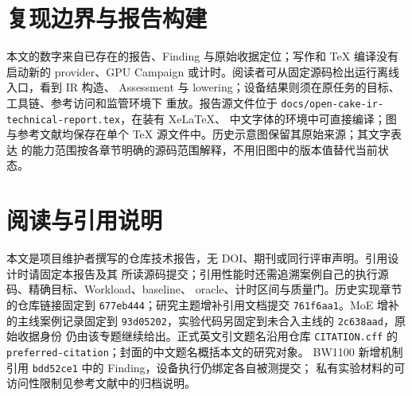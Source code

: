 \documentclass[UTF8,11pt,a4paper,fontset=none]{ctexart}
\newcommand{\code}[1]{\texttt{#1}}
\begin{document}
\section{复现边界与报告构建}

本文的数字来自已存在的报告、Finding 与原始收据定位；写作和 TeX 编译没有启动新的
provider、GPU Campaign 或计时。阅读者可从固定源码检出运行离线入口，看到 IR 构造、
Assessment 与 lowering；设备结果则须在原任务的目标、工具链、参考访问和监管环境下
重放。报告源文件位于 \code{docs/open-cake-ir-technical-report.tex}，在装有 XeLaTeX、
中文字体的环境中可直接编译；图与参考文献均保存在单个 TeX 源文件中。历史示意图保留其原始来源；其文字表达
的能力范围按各章节明确的源码范围解释，不用旧图中的版本值替代当前状态。

\section*{阅读与引用说明}
本文是项目维护者撰写的仓库技术报告，无 DOI、期刊或同行评审声明。引用设计时请固定本报告及其
所读源码提交；引用性能时还需追溯案例自己的执行源码、精确目标、Workload、baseline、
oracle、计时区间与质量门。历史实现章节的仓库链接固定到 \code{677eb444}；研究主题增补引用文档提交 \code{761f6aa1}。MoE 增补
的主线案例记录固定到 \code{93d05202}，实验代码另固定到未合入主线的 \code{2c638aad}，原始收据身份
仍由该专题继续给出。正式英文引文题名沿用仓库 \code{CITATION.cff}
的 \code{preferred-citation}；封面的中文题名概括本文的研究对象。
BW1100 新增机制引用 \code{bdd52ce1} 中的 Finding，设备执行仍绑定各自被测提交；
私有实验材料的可访问性限制见参考文献中的归档说明。
\end{document}
